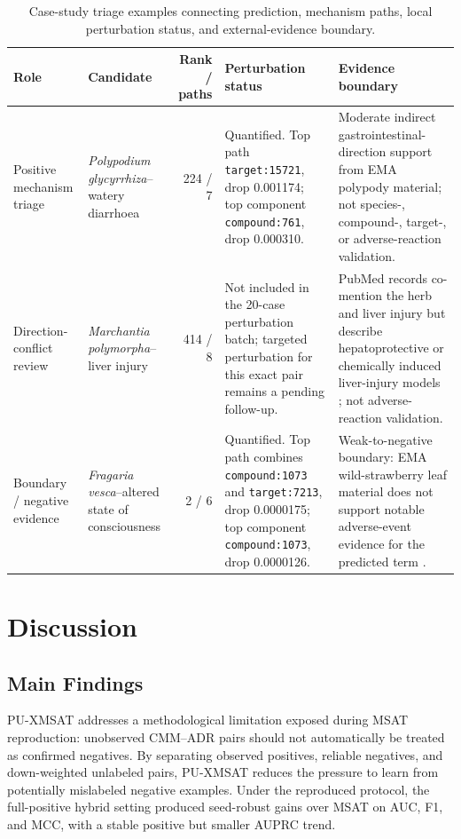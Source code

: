 \documentclass[manuscript,screen,review]{acmart}
\newcommand{\msat}{MSAT}
\newcommand{\px}{PU-XMSAT}
\begin{document}
\begin{table}[t]
\caption{Case-study triage examples connecting prediction, mechanism paths, local perturbation status, and external-evidence boundary.}
\label{tab:case-study-triage}
\footnotesize
\begin{tabularx}{\textwidth}{Y Y r Y Y}
\toprule
Role & Candidate & Rank / paths & Perturbation status & Evidence boundary \\
\midrule
Positive mechanism triage & \textit{Polypodium glycyrrhiza}--watery diarrhoea & 224 / 7 & Quantified. Top path \texttt{target:15721}, drop 0.001174; top component \texttt{compound:761}, drop 0.000310. & Moderate indirect gastrointestinal-direction support from EMA polypody material; not species-, compound-, target-, or adverse-reaction validation. \\
Direction-conflict review & \textit{Marchantia polymorpha}--liver injury & 414 / 8 & Not included in the 20-case perturbation batch; targeted perturbation for this exact pair remains a pending follow-up. & PubMed records co-mention the herb and liver injury but describe hepatoprotective or chemically induced liver-injury models \cite{marchantia_flavonoids_liver,marchantia_metabolic_hepatoprotective}; not adverse-reaction validation. \\
Boundary / negative evidence & \textit{Fragaria vesca}--altered state of consciousness & 2 / 6 & Quantified. Top path combines \texttt{compound:1073} and \texttt{target:7213}, drop 0.0000175; top component \texttt{compound:1073}, drop 0.0000126. & Weak-to-negative boundary: EMA wild-strawberry leaf material does not support notable adverse-event evidence for the predicted term \cite{ema_fragariae}. \\
\bottomrule
\end{tabularx}
\end{table}

\section{Discussion}

\subsection{Main Findings}

\px{} addresses a methodological limitation exposed during \msat{} reproduction: unobserved CMM--ADR pairs should not automatically be treated as confirmed negatives. By separating observed positives, reliable negatives, and down-weighted unlabeled pairs, \px{} reduces the pressure to learn from potentially mislabeled negative examples. Under the reproduced protocol, the full-positive hybrid setting produced seed-robust gains over \msat{} on AUC, F1, and MCC, with a stable positive but smaller AUPRC trend.
\end{document}

